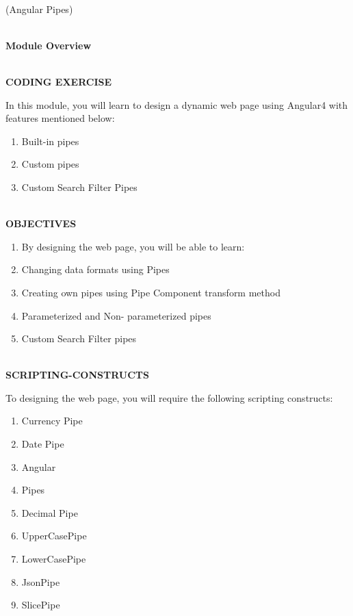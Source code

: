 \documentclass{article}
\begin{document}
\noindent 

\noindent 

\noindent 

\noindent 
\begin{center}
	\noindent \\ {\huge  (Angular Pipes)}
\end{center}


\noindent \textbf{}

\noindent \\ {\LARGE \textbf{Module Overview}}

\noindent \\ {\large \textbf{CODING EXERCISE}}

\noindent 

\noindent In this module, you will learn to design a dynamic web page using Angular4 with features mentioned below:

\noindent 

\begin{enumerate}
	\item Built-in pipes 
	\item Custom pipes
	\item Custom Search Filter Pipes
\end{enumerate}

 {\large \noindent \\ \textbf{OBJECTIVES} \\ }

\noindent 

\begin{enumerate}
	\item By designing the web page, you will be able to learn: 
	\item Changing data formats using Pipes
	\item Creating own pipes using Pipe Component transform method
	\item Parameterized and Non- parameterized pipes
	\item Custom Search Filter pipes
\end{enumerate}

\noindent \\ \textbf{SCRIPTING-CONSTRUCTS}

\noindent 

\noindent To designing the web page, you will require the following scripting constructs: 

\begin{enumerate}
	\item Currency Pipe
	\item Date Pipe 
	\item Angular
	\item Pipes
	\item Decimal Pipe
	\item UpperCasePipe
	\item LowerCasePipe
	\item JsonPipe
	\item SlicePipe
\end{enumerate}
\newpage
{} \\
\end{document}
